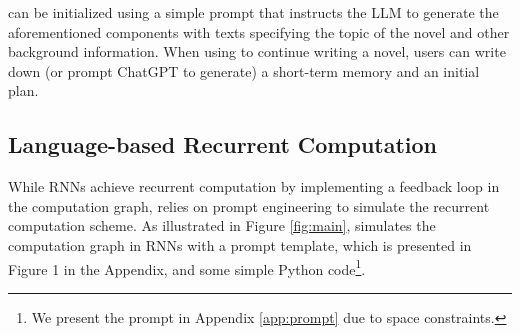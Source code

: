 \baby can be initialized using a simple prompt that instructs the LLM to generate the aforementioned components with texts specifying the topic of the novel and other background information. When using \baby to continue writing a novel, users can write down (or prompt ChatGPT to generate) a short-term memory and an initial plan.


\subsection{Language-based Recurrent Computation}
While RNNs achieve recurrent computation by implementing a feedback loop in the computation graph, \baby relies on prompt engineering to simulate the recurrent computation scheme. As illustrated in Figure \ref{fig:main}, \baby simulates the computation graph in RNNs with a prompt template, which is presented in Figure 1 in the Appendix, and some simple Python code\footnote{We present the prompt in Appendix \ref{app:prompt} due to space constraints.}. 

